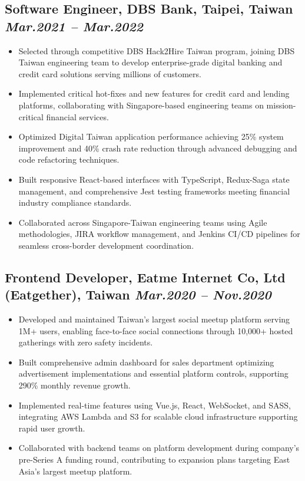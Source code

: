 \documentclass[11pt,a4paper]{article}
\newcommand{\resumeItem}[1]{\item\small{#1}}
\begin{document}
\subsection{Software Engineer, DBS Bank, Taipei, Taiwan \hfill \textit{Mar.2021 -- Mar.2022}}
\begin{itemize}[leftmargin=*, itemsep=1pt, parsep=0pt]
    \resumeItem{Selected through competitive DBS Hack2Hire Taiwan program, joining DBS Taiwan engineering team to develop enterprise-grade digital banking and credit card solutions serving millions of customers.}
    \resumeItem{Implemented critical hot-fixes and new features for credit card and lending platforms, collaborating with Singapore-based engineering teams on mission-critical financial services.}
    \resumeItem{Optimized Digital Taiwan application performance achieving 25\% system improvement and 40\% crash rate reduction through advanced debugging and code refactoring techniques.}
    \resumeItem{Built responsive React-based interfaces with TypeScript, Redux-Saga state management, and comprehensive Jest testing frameworks meeting financial industry compliance standards.}
    \resumeItem{Collaborated across Singapore-Taiwan engineering teams using Agile methodologies, JIRA workflow management, and Jenkins CI/CD pipelines for seamless cross-border development coordination.}
\end{itemize}

\subsection{Frontend Developer, Eatme Internet Co, Ltd (Eatgether), Taiwan \hfill \textit{Mar.2020 -- Nov.2020}}
\begin{itemize}[leftmargin=*, itemsep=1pt, parsep=0pt]
    \resumeItem{Developed and maintained Taiwan's largest social meetup platform serving 1M+ users, enabling face-to-face social connections through 10,000+ hosted gatherings with zero safety incidents.}
    \resumeItem{Built comprehensive admin dashboard for sales department optimizing advertisement implementations and essential platform controls, supporting 290\% monthly revenue growth.}
    \resumeItem{Implemented real-time features using Vue.js, React, WebSocket, and SASS, integrating AWS Lambda and S3 for scalable cloud infrastructure supporting rapid user growth.}
    \resumeItem{Collaborated with backend teams on platform development during company's pre-Series A funding round, contributing to expansion plans targeting East Asia's largest meetup platform.}
\end{itemize}
\end{document}
